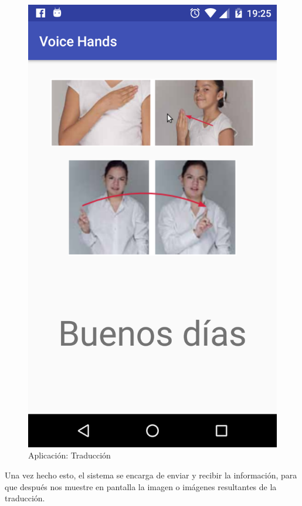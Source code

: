 \begin{figure}[H]
	\centering
	\includegraphics[scale = 0.2]{figures/app05}
	\caption{Aplicación: Traducción}
	\label{fig:app05}
\end{figure}

Una vez hecho esto, el sistema se encarga de enviar y recibir la información, para que después nos muestre en pantalla la imagen o imágenes resultantes de la traducción.

